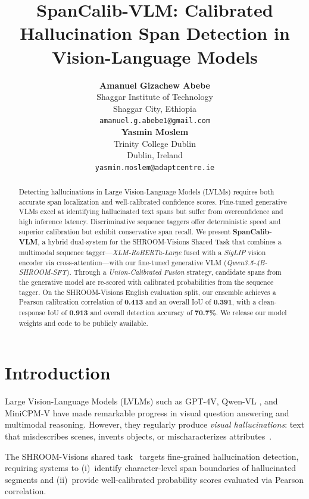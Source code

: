 \documentclass[11pt]{article}
\title{SpanCalib-VLM: Calibrated Hallucination Span Detection in Vision-Language Models}
\author{
  \textbf{Amanuel Gizachew Abebe} \vspace{5pt} \\
  Shaggar Institute of Technology \\
  Shaggar City, Ethiopia \\
  \texttt{\small amanuel.g.abebe1@gmail.com} \\
  \And
  \textbf{Yasmin Moslem} \vspace{5pt}\\
  Trinity College Dublin \\
  Dublin, Ireland \\
  \texttt{\small yasmin.moslem@adaptcentre.ie} 
}
\date{}
\begin{document}
\maketitle

\begin{abstract}
Detecting hallucinations in Large Vision-Language Models (LVLMs) requires both accurate span localization and well-calibrated confidence scores. Fine-tuned generative VLMs excel at identifying hallucinated text spans but suffer from overconfidence and high inference latency. Discriminative sequence taggers offer deterministic speed and superior calibration but exhibit conservative span recall. We present \textbf{SpanCalib-VLM}, a hybrid dual-system for the SHROOM-Visions Shared Task that combines a multimodal sequence tagger---\textit{XLM-RoBERTa-Large} fused with a \textit{SigLIP} vision encoder via cross-attention---with our fine-tuned generative VLM (\textit{Qwen3.5-4B-SHROOM-SFT}). Through a \emph{Union-Calibrated Fusion} strategy, candidate spans from the generative model are re-scored with calibrated probabilities from the sequence tagger. On the SHROOM-Visions English evaluation split, our ensemble achieves a Pearson calibration correlation of \textbf{0.413} and an overall IoU of \textbf{0.391}, with a clean-response IoU of \textbf{0.913} and overall detection accuracy of \textbf{70.7\%}. We release our model weights and code to be publicly available.
\end{abstract}

\section{Introduction}

Large Vision-Language Models (LVLMs) such as GPT-4V, Qwen-VL \citep{bai2023qwenvl}, and MiniCPM-V \cite{yao2024minicpm,yu2025minicpmv45} have made remarkable progress in visual question answering and multimodal reasoning. However, they regularly produce \emph{visual hallucinations}: text that misdescribes scenes, invents objects, or mischaracterizes attributes~\cite{li2023evaluating,liu2024survey}.

The SHROOM-Visions shared task~\cite{mickus2024shroom,vazquez2025mushroom} targets fine-grained hallucination detection, requiring systems to (i)~identify character-level span boundaries of hallucinated segments and (ii)~provide well-calibrated probability scores evaluated via Pearson correlation.
\end{document}
